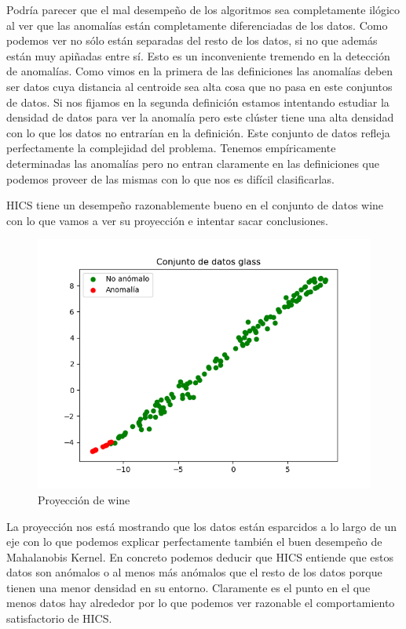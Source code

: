 Podría parecer que el mal desempeño de los algoritmos sea completamente ilógico al ver que las anomalías están completamente diferenciadas de los datos. Como podemos ver no sólo están separadas del resto de los datos, si no que además están muy apiñadas entre sí. Esto es un inconveniente tremendo en la detección de anomalías. Como vimos en la primera de las definiciones las anomalías deben ser datos cuya distancia al centroide sea alta cosa que no pasa en este conjuntos de datos. Si nos fijamos en la segunda definición estamos intentando estudiar la densidad de datos para ver la anomalía pero este clúster tiene una alta densidad con lo que los datos no entrarían en la definición. Este conjunto de datos refleja perfectamente la complejidad del problema. Tenemos empíricamente determinadas las anomalías pero no entran claramente en las definiciones que podemos proveer de las mismas con lo que nos es difícil clasificarlas.

HICS tiene un desempeño razonablemente bueno en el conjunto de datos wine con lo que vamos a ver su proyección e intentar sacar conclusiones.

\begin{figure}[H]
	\centering
	\includegraphics[scale=0.7]{imagenes/wine}
	\caption{Proyección de wine}
	\label{wine}
\end{figure}

La proyección nos está mostrando que los datos están esparcidos a lo largo de un eje con lo que podemos explicar perfectamente también el buen desempeño de Mahalanobis Kernel. En concreto podemos deducir que HICS entiende que estos datos son anómalos o al menos más anómalos que el resto de los datos porque tienen una menor densidad en su entorno. Claramente es el punto en el que menos datos hay alrededor por lo que podemos ver razonable el comportamiento satisfactorio de HICS.

